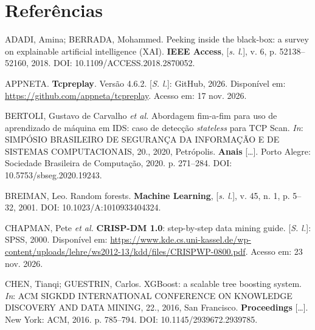 \documentclass[
  12pt,
  oneside,
  a4paper,
  chapter=TITLE,
  sumario=tradicional,
  english,
  brazil
]{abntex2}
\begin{document}
\postextual

\chapter*{Referências}
{}
\begingroup
\SingleSpacing
\setlength{\parindent}{0pt}
\setlength{\parskip}{\baselineskip}
\raggedright
ADADI, Amina; BERRADA, Mohammed. Peeking inside the black-box: a survey on explainable artificial
intelligence (XAI). \textbf{IEEE Access}, [\emph{s. l.}], v. 6, p. 52138--52160, 2018. DOI:
10.1109/ACCESS.2018.2870052.\par

APPNETA. \textbf{Tcpreplay}. Versão 4.6.2. [\emph{S. l.}]: GitHub, 2026. Disponível em:
\url{https://github.com/appneta/tcpreplay}. Acesso em: 17 nov. 2026.\par

BERTOLI, Gustavo de Carvalho \emph{et al.} Abordagem fim-a-fim para uso de aprendizado de máquina
em IDS: caso de detecção \emph{stateless} para TCP Scan. \emph{In}: SIMPÓSIO BRASILEIRO DE
SEGURANÇA DA INFORMAÇÃO E DE SISTEMAS COMPUTACIONAIS, 20., 2020, Petrópolis. \textbf{Anais}
[\ldots]. Porto Alegre: Sociedade Brasileira de Computação, 2020. p. 271--284. DOI: 10.5753/sbseg.2020.19243.\par

BREIMAN, Leo. Random forests. \textbf{Machine Learning}, [\emph{s. l.}], v. 45, n. 1, p. 5--32,
2001. DOI: 10.1023/A:1010933404324.\par

CHAPMAN, Pete \emph{et al.} \textbf{CRISP-DM 1.0}: step-by-step data mining guide. [\emph{S. l.}]:
SPSS, 2000. Disponível em:
\url{https://www.kde.cs.uni-kassel.de/wp-content/uploads/lehre/ws2012-13/kdd/files/CRISPWP-0800.pdf}.
Acesso em: 23 nov. 2026.\par

CHEN, Tianqi; GUESTRIN, Carlos. XGBoost: a scalable tree boosting system. \emph{In}: ACM SIGKDD
INTERNATIONAL CONFERENCE ON KNOWLEDGE DISCOVERY AND DATA MINING, 22., 2016, San Francisco.
\textbf{Proceedings} [\ldots]. New York: ACM, 2016. p. 785--794. DOI: 10.1145/2939672.2939785.\par
\end{document}
